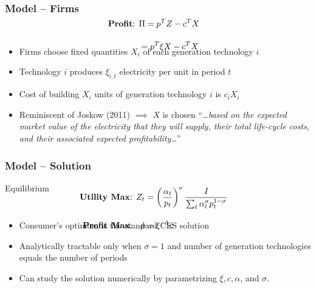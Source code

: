 \documentclass[aspectratio=169]{beamer}
\begin{document}
	\begin{frame}
		\frametitle{Model -- Firms}
		
		
		\vspace{1em}
		\begin{block}{}
			\small
			\begin{align*}
			\\[-3em] \text{\textbf{Profit}: } &\Pi = p^T Z - c^T X \\[1em]
			&= p^T \xi X - c^T X \\[-2.5em]
			\end{align*}
		\end{block}
		
		\begin{itemize}
			\setlength\itemsep{0.25em}
			\item Firms choose fixed quantities $X_i$ of each generation technology $i$ 
			\item Technology $i$ produces $\xi_{i,t}$ electricity per unit in period $t$
			\item Cost of building  $X_i$ units of generation technology $i$ is  $c_i X_i$
			\item Reminiscent of Joskow (2011) $\implies$ $X$ is chosen  ``\textit{\dots based on the expected market value of the electricity that they will supply, their total life-cycle costs, and their associated expected profitability\dots}''
		\end{itemize}
		
	\end{frame}
	
	\begin{frame}
		\frametitle{Model -- Solution}
		
		\metroset{block=fill}
		
		\begin{block}{\centering Equilibrium}
			\begin{align*}
			\\[-3em] \text{\textbf{Utility Max}: } Z_t &= \left(\frac{\alpha_t}{p_t} \right)^\sigma \frac{I}{\sum_t \alpha_t^\sigma p_t^{1-\sigma}} \\[1em]
			\text{\textbf{Profit Max}: \hspace{0.1em} }	p &= \xi^{-1} c \\[-2.5em]
			\end{align*}
		\end{block}
		
		\vspace{1em}
		
		\begin{itemize}
			\setlength\itemsep{0.25em}
			\item Consumer's optimum is the standard CES solution
			\item Analytically tractable only when $\sigma = 1$ and number of generation technologies equals the number of periods
			\item Can study the solution numerically by parametrizing $\xi, c, \alpha$, and $\sigma$. 
		\end{itemize}
		
		
	\end{frame}
	
\end{document}
